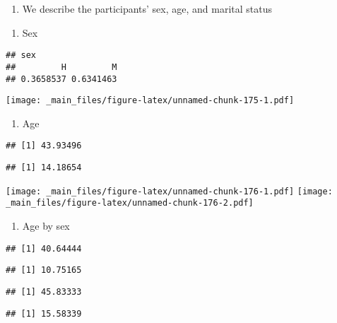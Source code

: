 \documentclass[
]{book}
\providecommand{\tightlist}{%
  \setlength{\itemsep}{0pt}\setlength{\parskip}{0pt}}
\begin{document}
\begin{enumerate}
\def\labelenumi{\arabic{enumi}.}
\tightlist
\item
  We describe the participants' sex, age, and marital status
\end{enumerate}

\begin{enumerate}
\def\labelenumi{\alph{enumi}.}
\tightlist
\item
  Sex
\end{enumerate}

\begin{verbatim}
## sex
##         H         M 
## 0.3658537 0.6341463
\end{verbatim}

\texttt{[image: \_main\_files/figure-latex/unnamed-chunk-175-1.pdf]}

\begin{enumerate}
\def\labelenumi{\alph{enumi}.}
\setcounter{enumi}{1}
\tightlist
\item
  Age
\end{enumerate}

\begin{verbatim}
## [1] 43.93496
\end{verbatim}

\begin{verbatim}
## [1] 14.18654
\end{verbatim}

\texttt{[image: \_main\_files/figure-latex/unnamed-chunk-176-1.pdf]} \texttt{[image: \_main\_files/figure-latex/unnamed-chunk-176-2.pdf]}

\begin{enumerate}
\def\labelenumi{\alph{enumi}.}
\setcounter{enumi}{2}
\tightlist
\item
  Age by sex
\end{enumerate}

\begin{verbatim}
## [1] 40.64444
\end{verbatim}

\begin{verbatim}
## [1] 10.75165
\end{verbatim}

\begin{verbatim}
## [1] 45.83333
\end{verbatim}

\begin{verbatim}
## [1] 15.58339
\end{verbatim}
\end{document}
